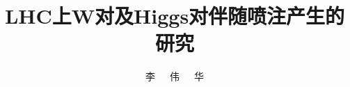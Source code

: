 ﻿\documentclass[doctor,euler,twoside,openright]{ustcthesis}
\title{LHC上W对及Higgs对伴随喷注产生的研究}
\author{李~~~伟~~~华}
\begin{document}
  \maketitle

\frontmatter
\makeatletter
\ifustc@bachelor
	
	
	\tableofcontents

	\ustclot
	\ustclof
	\ustcloa
	
\else
	\tableofcontents

	
\fi
\makeatother

\mainmatter

  
  
  
  
  

\backmatter

%  
   

  \begin{appendix}
    
  \end{appendix}

  \makeatletter
  \ifustc@bachelor\relax\else
    
  \fi
  \makeatother
\end{document}
